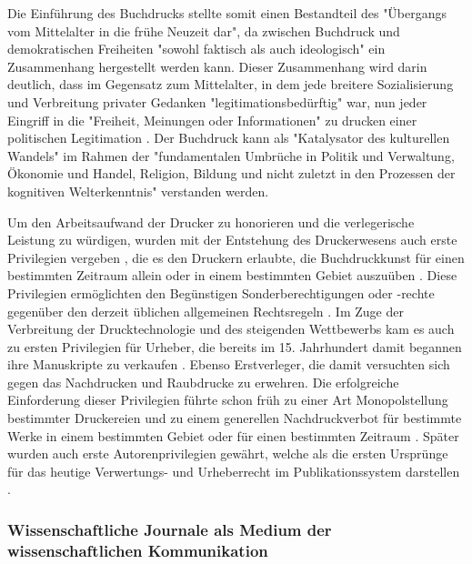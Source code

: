 Die Einführung des Buchdrucks stellte somit einen Bestandteil des "Übergangs vom Mittelalter in die frühe Neuzeit dar"\cite{lange2008medienwettbewerb}, da zwischen Buchdruck und demokratischen Freiheiten "sowohl faktisch als auch ideologisch" \cite{suchen} ein Zusammenhang hergestellt werden kann. Dieser Zusammenhang wird darin deutlich, dass im Gegensatz zum Mittelalter, in dem jede breitere Sozialisierung und Verbreitung privater Gedanken "legitimationsbedürftig" war, nun jeder Eingriff in die "Freiheit, Meinungen oder Informationen" zu drucken einer politischen Legitimation \cite{giesecke_1991_buchdruck}. Der Buchdruck kann als "Katalysator des kulturellen Wandels"\cite{giesecke_1991_buchdruck} im Rahmen der "fundamentalen Umbrüche in Politik und Verwaltung, Ökonomie und Handel, Religion, Bildung und nicht zuletzt in den Prozessen der kognitiven Welterkenntnis" \cite{pscheida_2010_wikipedia} verstanden werden.

Um den Arbeitsaufwand der Drucker zu honorieren und die verlegerische Leistung zu würdigen\cite{szilagyi_2011_leistungsschutzrecht}, wurden mit der Entstehung des Druckerwesens auch erste Privilegien vergeben \cite{gieseke_1995_privileg}, die es den Druckern erlaubte, die Buchdruckkunst für einen bestimmten Zeitraum allein oder in einem bestimmten Gebiet auszuüben \cite{martin2008publizistische} \cite{koller_1995_Urheberrecht}. Diese Privilegien ermöglichten den Begünstigen Sonderberechtigungen oder -rechte gegenüber den derzeit üblichen allgemeinen Rechtsregeln \cite{jaenich_2002_geistiges}. Im Zuge der Verbreitung der Drucktechnologie und des steigenden Wettbewerbs kam es auch zu ersten Privilegien für Urheber, die bereits im 15. Jahrhundert damit begannen ihre Manuskripte zu verkaufen \cite{hesse2002rise}. Ebenso Erstverleger, die damit versuchten sich gegen das Nachdrucken und Raubdrucke zu erwehren. Die erfolgreiche Einforderung dieser Privilegien führte schon früh zu einer Art Monopolstellung bestimmter Druckereien und zu einem generellen Nachdruckverbot für bestimmte Werke in einem bestimmten Gebiet oder für einen bestimmten Zeitraum \cite{szilagyi_2011_leistungsschutzrecht} \cite{hesse2002rise}. Später wurden auch erste Autorenprivilegien gewährt, welche als die ersten Ursprünge für das heutige Verwertungs- und Urheberrecht im Publikationssystem darstellen \cite{koller_1995_Urheberrecht}.

\subsubsection{Wissenschaftliche Journale als Medium der wissenschaftlichen Kommunikation}

